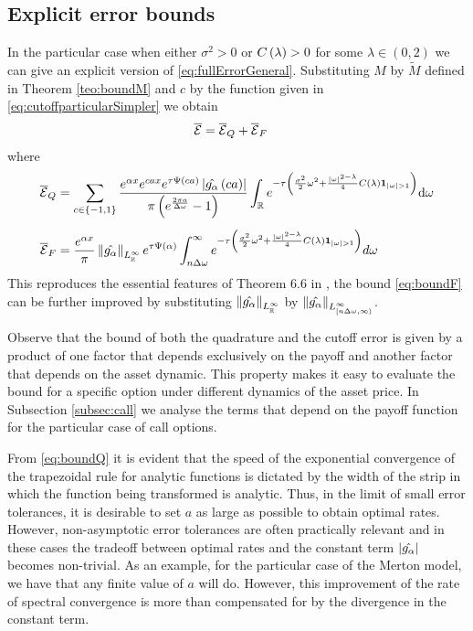 \documentclass[11pt]{amsart}
\begin{document}
\subsection{Explicit error bounds}
\label{ss:bounds}
In the particular case when either $\sigma^2>0$ or 
$C \left( {\lambda} \right)>0$ for some $\lambda \in (0,2)$ we can give an explicit version 
of \eqref{eq:fullErrorGeneral}. Substituting $M$ by $\tilde{M}$ defined in Theorem \ref{teo:boundM} and $c$ by the function given in \eqref{eq:cutoffparticularSimpler} we obtain
\begin{align}%
\label{eq:fullErrorExpression}
\est &= \estQuadrature + \estFrequency
\end{align}
where
\begin{align}
\label{eq:boundQ} \estQuadrature &= 
\ssum{c\in \sset{-1,1}}{} 
\frac{
\expfs{\damp x}
\expfs{cax}
\expfs{\tau \Psi \parent{ca}} \absval{\ft{\ga} \parent{ca}}}{\pi \parent{ \expfs{\frac{2 \pi a}{\step}} -1}}
\int_{\R}  \expfs{-\tau \left( \frac{\sigma^2}{2}\omega^2 + \frac{|\omega|^{2 - \lambda}}{4} \cl\indicator_{\absval{\omega}>1}\right) } \d \omega
\\[.5em]
\label{eq:boundF}
\estFrequency &= \frac{\expfs{\damp x}}{\pi}
\norminf{\ft{\ga}}{\R}
\expfs{\tau \charExp{\damp}} \int_{n\step}^{\infty} 
\expfs{-\tau \parent{\frac{\sigma^2}{2} \omega^2+\frac{|\omega|^{2 - \lambda}}{4} \cl \indicator_{\absval{\omega}>1}} } d\omega
\end{align}
This reproduces the essential features of Theorem 6.6
in \cite{fenglinetsky},
the bound \eqref{eq:boundF} can be further improved by substituting $\left\|\hat{g_{\alpha}}\right\|_{L^\infty_{\mathbb{R}}}$ by $\left\|\hat{g_{\alpha}}\right\|_{L^\infty_{[n\Delta\omega,\infty)}}$.

\begin{remark}\label{rem:decuople}
Observe that the bound of both the quadrature and the cutoff error is given
by a product of one factor that depends exclusively on the payoff and 
another factor that depends on the asset dynamic. This property makes it easy to evaluate
the bound for a specific option under different dynamics of the asset price.
In Subsection \ref{subsec:call} we analyse the terms
that depend on the payoff function for the particular case of call options.
\end{remark}


\begin{remark}\label{rem:asynonasy}
From \eqref{eq:boundQ} it is evident that the speed of the exponential convergence
of the trapezoidal rule for analytic functions is dictated by the width of the strip in which
the function being transformed is analytic. Thus, in the limit of small error tolerances,
it is desirable to set $a$ as large as possible to obtain optimal rates.
However, non-asymptotic error tolerances are often practically relevant and in these
cases the tradeoff between optimal rates and the constant term $\left| {\hat{g_{\alpha}}} \right|$
becomes non-trivial. As an example, for the particular case of the Merton model,
we have that any finite value of $a$ will do. However, this improvement of the rate of
spectral convergence is more than compensated for by the divergence in the constant term.
\end{remark}
\end{document}
